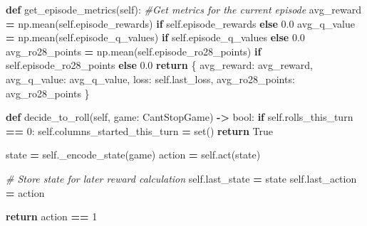 \documentclass[12pt]{article}
\newenvironment{Shaded}{\begin{snugshade}}{\end{snugshade}}
\newcommand{\BuiltInTok}[1]{#1}
\newcommand{\CommentTok}[1]{\textcolor[rgb]{0.56,0.35,0.01}{\textit{#1}}}
\newcommand{\ControlFlowTok}[1]{\textcolor[rgb]{0.13,0.29,0.53}{\textbf{#1}}}
\newcommand{\DecValTok}[1]{\textcolor[rgb]{0.00,0.00,0.81}{#1}}
\newcommand{\FloatTok}[1]{\textcolor[rgb]{0.00,0.00,0.81}{#1}}
\newcommand{\KeywordTok}[1]{\textcolor[rgb]{0.13,0.29,0.53}{\textbf{#1}}}
\newcommand{\NormalTok}[1]{#1}
\newcommand{\OperatorTok}[1]{\textcolor[rgb]{0.81,0.36,0.00}{\textbf{#1}}}
\newcommand{\StringTok}[1]{\textcolor[rgb]{0.31,0.60,0.02}{#1}}
\newcommand{\VariableTok}[1]{\textcolor[rgb]{0.00,0.00,0.00}{#1}}
\begin{document}
\begin{thesis}
\begin{Shaded}
\begin{Highlighting}[]
    \KeywordTok{def}\NormalTok{ get\_episode\_metrics(}\VariableTok{self}\NormalTok{):}
        \CommentTok{\#Get metrics for the current episode}
\NormalTok{        avg\_reward }\OperatorTok{=}\NormalTok{ np.mean(}\VariableTok{self}\NormalTok{.episode\_rewards) }
                              \ControlFlowTok{if} \VariableTok{self}\NormalTok{.episode\_rewards }\ControlFlowTok{else} \FloatTok{0.0}
\NormalTok{        avg\_q\_value }\OperatorTok{=}\NormalTok{ np.mean(}\VariableTok{self}\NormalTok{.episode\_q\_values) }
                              \ControlFlowTok{if} \VariableTok{self}\NormalTok{.episode\_q\_values }\ControlFlowTok{else} \FloatTok{0.0}
\NormalTok{        avg\_ro28\_points }\OperatorTok{=}\NormalTok{ np.mean(}\VariableTok{self}\NormalTok{.episode\_ro28\_points) }
                                  \ControlFlowTok{if} \VariableTok{self}\NormalTok{.episode\_ro28\_points }\ControlFlowTok{else} \FloatTok{0.0}
        \ControlFlowTok{return}\NormalTok{ \{}
            \StringTok{\textquotesingle{}avg\_reward\textquotesingle{}}\NormalTok{: avg\_reward,}
            \StringTok{\textquotesingle{}avg\_q\_value\textquotesingle{}}\NormalTok{: avg\_q\_value,}
            \StringTok{\textquotesingle{}loss\textquotesingle{}}\NormalTok{: }\VariableTok{self}\NormalTok{.last\_loss,}
            \StringTok{\textquotesingle{}avg\_ro28\_points\textquotesingle{}}\NormalTok{: avg\_ro28\_points}
\NormalTok{        \}}

    \KeywordTok{def}\NormalTok{ decide\_to\_roll(}\VariableTok{self}\NormalTok{, game: CantStopGame) }\OperatorTok{{-}\textgreater{}} \BuiltInTok{bool}\NormalTok{:}
        \ControlFlowTok{if} \VariableTok{self}\NormalTok{.rolls\_this\_turn }\OperatorTok{==} \DecValTok{0}\NormalTok{:}
            \VariableTok{self}\NormalTok{.columns\_started\_this\_turn }\OperatorTok{=} \BuiltInTok{set}\NormalTok{()}
            \ControlFlowTok{return} \VariableTok{True}
        
\NormalTok{        state }\OperatorTok{=} \VariableTok{self}\NormalTok{.\_encode\_state(game)}
\NormalTok{        action }\OperatorTok{=} \VariableTok{self}\NormalTok{.act(state)}
        
        \CommentTok{\# Store state for later reward calculation}
        \VariableTok{self}\NormalTok{.last\_state }\OperatorTok{=}\NormalTok{ state}
        \VariableTok{self}\NormalTok{.last\_action }\OperatorTok{=}\NormalTok{ action}
        
        \ControlFlowTok{return}\NormalTok{ action }\OperatorTok{==} \DecValTok{1}
    

\end{Highlighting}
\end{Shaded}
\end{thesis}
\end{document}
